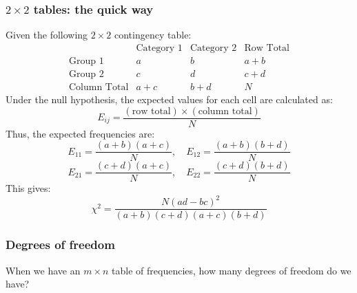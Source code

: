 \documentclass[t,8pt]{beamer}%
\begin{document}
\begin{frame}
	\frametitle{$2\times 2$ tables: the quick way}
    Given the following \(2 \times 2\) contingency table:
\[
\begin{array}{c|cc|c}
  & \text{Category 1} & \text{Category 2} & \text{Row Total} \\
  \hline
  \text{Group 1} & a & b & a + b \\
  \text{Group 2} & c & d & c + d \\
  \hline
  \text{Column Total} & a + c & b + d & N
\end{array}
\]
Under the null hypothesis, the expected values for each cell are calculated as:
\[
E_{ij} = \frac{(\text{row total}) \times (\text{column total})}{N}
\]
Thus, the expected frequencies are:
\[
E_{11} = \frac{(a+b)(a+c)}{N}, \quad
E_{12} = \frac{(a+b)(b+d)}{N}
\]
\[
E_{21} = \frac{(c+d)(a+c)}{N}, \quad
E_{22} = \frac{(c+d)(b+d)}{N}
\]
This gives:
$$\chi^2 = \frac{N(ad - bc)^2}{(a + b)(c + d)(a + c)(b + d)}$$
\end{frame}

\begin{frame}
	\frametitle{Degrees of freedom}
    When we have an $m\times n$ table of frequencies, how many degrees of freedom do we have?
    \begin{center}
    \end{center}
    
\end{frame}
\end{document}
